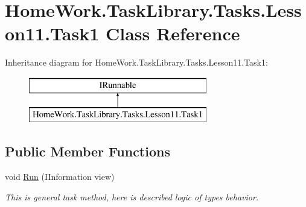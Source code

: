 \hypertarget{class_home_work_1_1_task_library_1_1_tasks_1_1_lesson11_1_1_task1}{}\section{Home\+Work.\+Task\+Library.\+Tasks.\+Lesson11.\+Task1 Class Reference}
\label{class_home_work_1_1_task_library_1_1_tasks_1_1_lesson11_1_1_task1}
Inheritance diagram for Home\+Work.\+Task\+Library.\+Tasks.\+Lesson11.\+Task1\+:\begin{figure}[H]
\begin{center}
\leavevmode
\includegraphics[height=2.000000cm]{class_home_work_1_1_task_library_1_1_tasks_1_1_lesson11_1_1_task1}
\end{center}
\end{figure}
\subsection*{Public Member Functions}
\begin{DoxyCompactItemize}
\item 
void \mbox{\hyperlink{class_home_work_1_1_task_library_1_1_tasks_1_1_lesson11_1_1_task1_a0af293bc57bda8a21bd7dac20fb41077}{Run}} (I\+Information view)
\begin{DoxyCompactList}\small\item\em This is general task method, here is described logic of types behavior. \end{DoxyCompactList}\end{DoxyCompactItemize}
